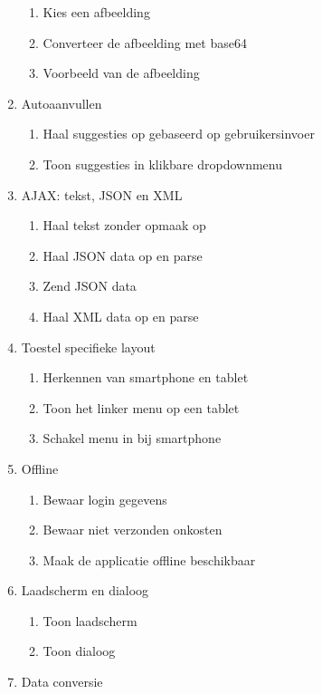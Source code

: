 \begin{enumerate}[label*=U \arabic*.]
\begin{enumerate}[label*=\arabic*]
\item Kies een afbeelding
\item Converteer de afbeelding met base64
\item Voorbeeld van de afbeelding
\end{enumerate}
\item \label{challenge:autoaanvullen}Autoaanvullen
\begin{enumerate}[label*=\arabic*]
\item Haal suggesties op gebaseerd op gebruikersinvoer
\item Toon suggesties in klikbare dropdownmenu
\end{enumerate}
\item \label{challenge:ajax}AJAX: tekst, JSON en XML
\begin{enumerate}[label*=\arabic*]
\item Haal tekst zonder opmaak op
\item Haal JSON data op en parse
\item Zend JSON data
\item Haal XML data op en parse
\end{enumerate}
\item \label{challenge:toestel}Toestel specifieke layout
\begin{enumerate}[label*=\arabic*]
\item Herkennen van smartphone en tablet
\item Toon het linker menu op een tablet
\item Schakel menu in bij smartphone
\end{enumerate}
\item \label{challenge:offline}Offline
\begin{enumerate}[label*=\arabic*]
\item Bewaar login gegevens
\item Bewaar niet verzonden onkosten
\item Maak de applicatie offline beschikbaar
\end{enumerate}
\item \label{challenge:laadscherm}Laadscherm en dialoog
\begin{enumerate}[label*=\arabic*]
\item Toon laadscherm
\item Toon dialoog
\end{enumerate}
\item \label{challenge:conversie}Data conversie

\end{enumerate}
